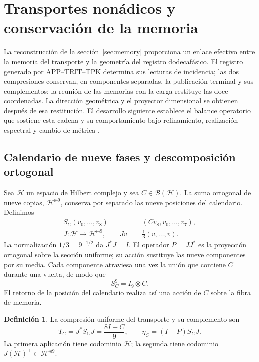 \documentclass[a4paper,10pt]{article}
\theoremstyle{definition}\newtheorem{definition}[theorem]{Definición}
\theoremstyle{remark}\newtheorem{remark}[theorem]{Observación}
\numberwithin{equation}{section}
\begin{document}
\section{Transportes nonádicos y conservación de la memoria}
\label{sec:nonadic}

La reconstrucción de la sección~\ref{sec:memory} proporciona un enlace
efectivo entre la memoria del transporte y la geometría del registro
dodecafásico. El registro generado por APP--TRIT--TPK determina sus
lecturas de incidencia; las dos compresiones conservan, en componentes
separadas, la publicación terminal y sus complementos; la reunión de
las memorias con la carga restituye las doce coordenadas. La dirección
geométrica y el proyector dimensional se obtienen después de esa
restitución. El desarrollo siguiente establece el balance operatorio
que sostiene esta cadena y su comportamiento bajo refinamiento,
realización espectral y cambio de métrica
\cite{HMT-VIII,hmtX}.

\subsection{Calendario de nueve fases y descomposición ortogonal}

Sea \(\mathcal H\) un espacio de Hilbert complejo y sea
\(C\in\mathcal B(\mathcal H)\). La suma ortogonal de nueve copias,
\(\mathcal H^{\oplus9}\), conserva por separado las nueve posiciones
del calendario. Definimos
\begin{equation}
 \begin{split}
 S_C(v_0,\ldots,v_8)&=(Cv_8,v_0,\ldots,v_7),\\
 J:\mathcal H\longrightarrow\mathcal H^{\oplus9},
 \qquad Jv&=\frac13(v,\ldots,v).
 \end{split}
 \label{nt:calendar}
\end{equation}
La normalización \(1/3=9^{-1/2}\) da \(J^*J=I\). El operador
\(P=JJ^*\) es la proyección ortogonal sobre la sección uniforme;
su acción sustituye las nueve componentes por su media. Cada
componente atraviesa una vez la unión que contiene \(C\) durante una
vuelta, de modo que
\begin{equation}
 S_C^9=I_9\otimes C.
 \label{nt:full-return}
\end{equation}
El retorno de la posición del calendario realiza así una acción de
\(C\) sobre la fibra de memoria.

\begin{definition}
La compresión uniforme del transporte y su complemento son
\begin{equation}
 T_C=J^*S_CJ=\frac{8I+C}{9},
 \qquad
 \eta_C=(I-P)S_CJ.
 \label{nt:compression}
\end{equation}
La primera aplicación tiene codominio \(\mathcal H\); la segunda
tiene codominio \(J(\mathcal H)^\perp\subset\mathcal H^{\oplus9}\).
\end{definition}
\end{document}
